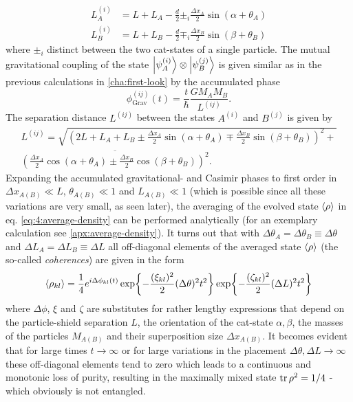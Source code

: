 \begin{align}\label{eq:4:L-casimir}
  L^{(i)}_{A} &= L + L_{A} - \frac{d}{2} \pm_i \frac{\Delta x_{A}}{2} \sin(\alpha + \theta_{A}) \\
  L^{(i)}_{B} &= L + L_{B} - \frac{d}{2} \mp_i \frac{\Delta x_{B}}{2} \sin(\beta + \theta_{B})
\end{align}
where $\pm_i$ distinct between the two cat-states of a single particle.
The mutual gravitational coupling of the state $\ket{\psi^{(i)}_A}\otimes\ket{\psi^{(j)}_B}$ is given similar as in the previous calculations in \cref{cha:first-look} by the accumulated phase
\begin{equation}\label{eq:4:phi-grav}
  \phi^{(ij)}_\mathrm{Grav}(t) = \frac{t}{\hbar} \frac{G M_A M_B}{L^{(ij)}} .
\end{equation}
The separation distance $L^{(ij)}$ between the states $A^{(i)}$ and $B^{(j)}$ is given by
\begin{multline}\label{eq:4:L-gravity}
  L^{(ij)} = \sqrt{\left(2L + L_A + L_B \pm \frac{\Delta x_A}{2}\sin(\alpha + \theta_A) \mp \frac{\Delta x_B}{2}\sin(\beta + \theta_B)\right)^2 +} \\ \overline{\left(\frac{\Delta x_A}{2}\cos(\alpha + \theta_A) \pm \frac{\Delta x_B}{2}\cos(\beta + \theta_B)\right)^2} .
\end{multline}
Expanding the accumulated gravitational- and Casimir phases to first order in $\Delta x_{A(B)} \ll L$, $\theta_{A(B)} \ll 1$ and $L_{A(B)} \ll 1$ (which is possible since all these variations are very small, as seen later), the averaging of the evolved state $\left\langle\rho\right\rangle$ in eq. \eqref{eq:4:average-density} can be performed analytically (for an exemplary calculation see \cref{apx:average-density}).
It turns out that with $\Delta \theta_A = \Delta \theta_B \equiv \Delta\theta$ and $\Delta L_A = \Delta L_B \equiv \Delta L$ all off-diagonal elements of the averaged state $\left\langle\rho\right\rangle$ (the so-called \emph{coherences}) are given in the form
\begin{equation}\label{eq:4:average-density-element}
  \left\langle\rho_{kl}\right\rangle = \frac{1}{4} e^{i \Delta \phi_{kl}(t)} \exp{-\frac{(\xi_{kl})^2}{2} (\Delta\theta)^2 t^2} \exp{-\frac{(\zeta_{kl})^2}{2} (\Delta L)^2 t^2}
\end{equation}
where $\Delta \phi$, $\xi$ and $\zeta$ are substitutes for rather lengthy expressions that depend on the particle-shield separation $L$, the orientation of the cat-state $\alpha, \beta$, the masses of the particles $M_{A(B)}$ and their superposition size $\Delta x_{A(B)}$.
It becomes evident that for large times $t\rightarrow \infty$ or for large variations in the placement $\Delta \theta, \Delta L \rightarrow \infty$ these off-diagonal elements tend to zero which leads to a continuous and monotonic loss of purity, resulting in the maximally mixed state $\tr\rho^2 = 1/4$ - which obviously is not entangled.

